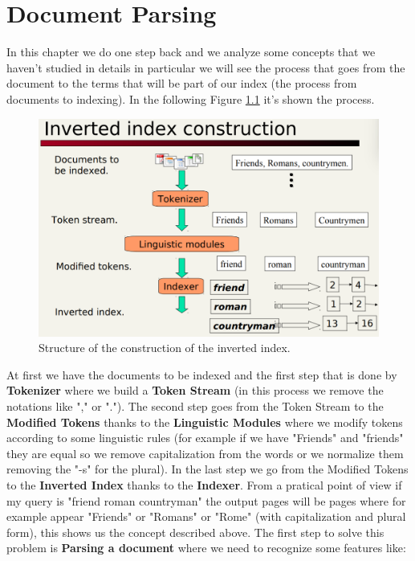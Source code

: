 \chapter{Document Parsing}
In this chapter we do one step back and we analyze some concepts that we haven't studied in details in particular we will see the process that goes from the document to the terms that will be part of our index (the process from documents to indexing).\newline
In the following Figure \ref{fig:invertedindexconstruction} it's shown the process.
\begin{figure}
    \centering
    \includegraphics[width=0.75\linewidth]{images/invertedindexconstruction.png}
    \caption{Structure of the construction of the inverted index.}
    \label{fig:invertedindexconstruction}
\end{figure}
At first we have the documents to be indexed and the first step that is done by \textbf{Tokenizer} where we build a \textbf{Token Stream} (in this process we remove the notations like "," or "."). The second step goes from the Token Stream to the \textbf{Modified Tokens} thanks to the \textbf{Linguistic Modules} where we modify tokens according to some linguistic rules (for example if we have "Friends" and "friends" they are equal so we remove capitalization from the words or we normalize them removing the "-s" for the plural). In the last step we go from the Modified Tokens to the \textbf{Inverted Index} thanks to the \textbf{Indexer}.\newline
From a pratical point of view if my query is "friend roman countryman" the output pages will be pages where for example appear "Friends" or "Romans" or "Rome" (with capitalization and plural form), this shows us the concept described above.\newline
The first step to solve this problem is \textbf{Parsing a document} where we need to recognize some features like:
